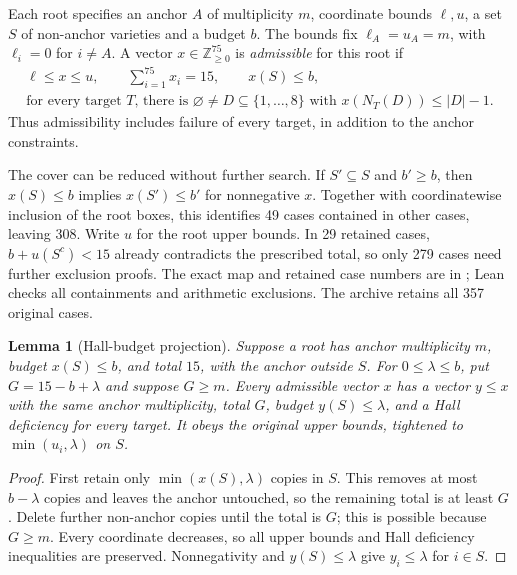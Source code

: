 \documentclass[11pt]{article}
\newtheorem{lemma}[theorem]{Lemma}
\theoremstyle{remark}
\begin{document}
Each root specifies an anchor $A$ of multiplicity $m$, coordinate bounds
$\ell,u$, a set $S$ of non-anchor varieties and a budget $b$.
The bounds fix $\ell_A=u_A=m$, with $\ell_i=0$ for $i\ne A$.
A vector $x\in\mathbb Z_{\ge0}^{75}$ is \emph{admissible} for this root if
\begin{equation}\label{eq:admissible}
\begin{gathered}
 \ell\le x\le u,\qquad \sum_{i=1}^{75}x_i=15,\qquad x(S)\le b,\\
 \text{for every target }T\text{, there is }\varnothing\ne D\subseteq\{1,\ldots,8\}
 \text{ with }x(N_T(D))\le |D|-1.
\end{gathered}
\end{equation}
Thus admissibility includes failure of every target, in addition to the
anchor constraints.

The cover can be reduced without further search. If $S'\subseteq S$ and
$b'\ge b$, then $x(S)\le b$ implies $x(S')\le b'$ for nonnegative $x$.
Together with coordinatewise inclusion of the root boxes, this identifies
49 cases contained in other cases, leaving 308. Write $u$ for the root upper
bounds. In 29 retained cases, $b+u(S^c)<15$ already contradicts the prescribed
total, so only 279 cases
need further exclusion proofs. The exact map and retained case numbers are
in ; Lean checks all containments and
arithmetic exclusions. The archive retains all 357 original cases.

\begin{lemma}[Hall-budget projection]\label{lem:projection}
Suppose a root has anchor multiplicity $m$, budget $x(S)\le b$, and total
$15$, with the anchor outside $S$. For $0\le \lambda\le b$, put $G=15-b+\lambda$
and suppose $G\ge m$. Every admissible vector $x$ has a vector $y\le x$
with the same anchor multiplicity, total $G$, budget $y(S)\le \lambda$, and a
Hall deficiency for every target. It obeys the original upper bounds,
tightened to $\min(u_i,\lambda)$ on $S$.
\end{lemma}
\begin{proof}
First retain only $\min(x(S),\lambda)$ copies in $S$. This removes at most $b-\lambda$
copies and leaves the anchor untouched, so the remaining total is at least
$G$. Delete further non-anchor copies until the total is $G$; this is possible
because $G\ge m$. Every coordinate decreases, so all upper bounds and Hall
deficiency inequalities are preserved. Nonnegativity and $y(S)\le \lambda$ give
$y_i\le \lambda$ for $i\in S$.
\end{proof}
\end{document}
